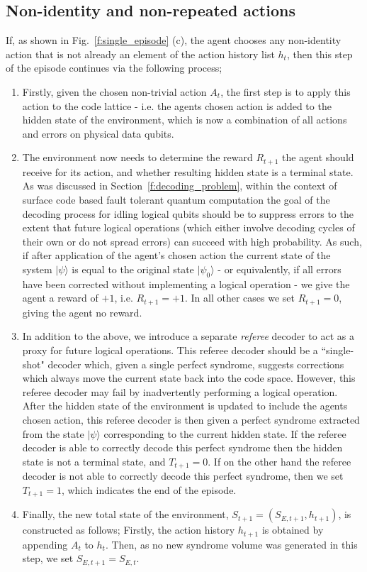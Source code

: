 \documentclass[twocolumn,preprintnumbers,amsmath,amssymb,notitlepage,nofootinbib,longbibliography,superscriptaddress,aps,pra,10pt]{revtex4-1}
\begin{document}
	\subsection{Non-identity and non-repeated actions}

		If, as shown in Fig.\ \ref{f:single_episode} (c), the agent chooses any non-identity action that is not already an element of the action history list $h_t$, then this step of the episode continues via the following process;

		\begin{enumerate}
			\item Firstly, given the chosen non-trivial action $A_t$, the first step is to apply this action to the code lattice - i.e. the agents chosen action is added to the hidden state of the environment, which is now a combination of all actions and errors on physical data qubits.
			\item The environment now needs to determine the reward $R_{t+1}$ the agent should receive for its action, and whether resulting hidden state is a terminal state.
			As was discussed in Section~\ref{f:decoding_problem}, within the context of surface code based fault tolerant quantum computation the goal of the decoding process for idling logical qubits should be to suppress errors to the extent that future logical operations (which either involve decoding cycles of their own or do not spread errors) can succeed with high probability.
			As such, if after application of the agent's chosen action the current state of the system $|\psi\rangle$ is equal to the original state $|\psi_0\rangle$ - or equivalently, if all errors have been corrected without implementing a logical operation - we give the agent a reward of $+1$, i.e. $R_{t+1} = +1$.
			In all other cases we set $R_{t+1} = 0$, giving the agent no reward.
			\item In addition to the above, we introduce a separate \emph{referee} decoder to act as a proxy for future logical operations.
			This referee decoder should be a ``single-shot" decoder which, given a single perfect syndrome, suggests corrections which always move the current state back into the code space.
			However, this referee decoder may fail by inadvertently performing a logical operation.
			After the hidden state of the environment is updated to include the agents chosen action, this referee decoder is then given a perfect syndrome extracted from the state $|\psi\rangle$ corresponding to the current hidden state.
			If the referee decoder is able to correctly decode this perfect syndrome then the hidden state is not a terminal state, and $T_{t+1} = 0$.
			If on the other hand the referee decoder is not able to correctly decode this perfect syndrome, then we set $T_{t+1}=1$, which indicates the end of the episode.
			\item Finally, the new total state of the environment,  $S_{t+1} = (S_{E,t+1},h_{t+1})$, is constructed as follows;
			Firstly, the action history $h_{t+1}$ is obtained by appending $A_t$ to $h_t$.
			Then, as no new syndrome volume was generated in this step, we set $S_{E,{t+1}} = S_{E,t}$.
		\end{enumerate}
		
\end{document}
